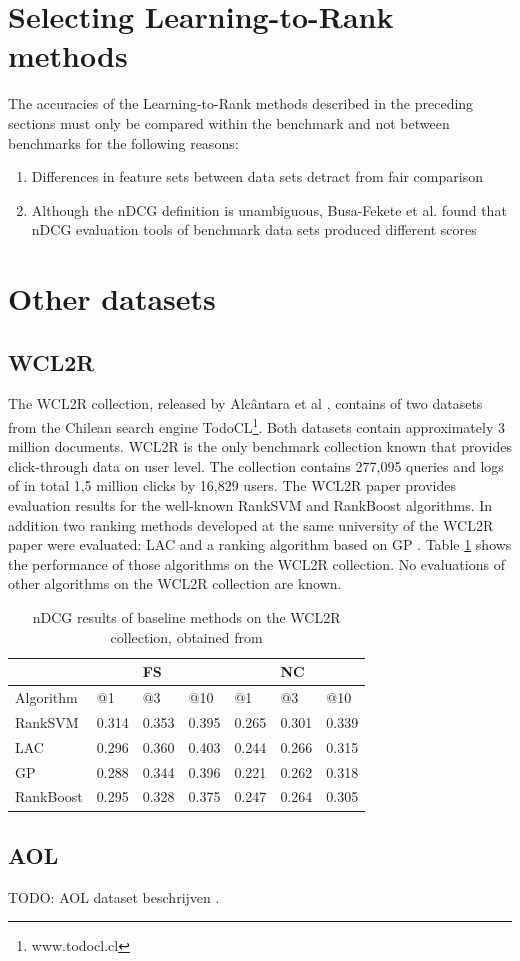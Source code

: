 \section{Selecting Learning-to-Rank methods}
The accuracies of the Learning-to-Rank methods described in the preceding sections must only be compared within the benchmark and not between benchmarks for the following reasons:
\begin{enumerate}
\item Differences in feature sets between data sets detract from fair comparison
\item Although the \ac{nDCG} definition is unambiguous, Busa-Fekete et al. \cite{Busa-Fekete2012} found that \ac{nDCG} evaluation tools of benchmark data sets produced different scores
\end{enumerate}

\section{Other datasets}
\subsection{WCL2R}
The WCL2R collection, released by Alc{\^a}ntara et al \cite{Alcantara2010}, contains of two datasets from the Chilean search engine TodoCL\footnote{www.todocl.cl}. Both datasets contain approximately 3 million documents. WCL2R is the only benchmark collection known that provides click-through data on user level. The collection contains 277,095 queries and logs of in total 1,5 million clicks by 16,829 users. The WCL2R paper provides evaluation results for the well-known Rank\ac{SVM} \cite{Herbrich1999,Joachims2002} and RankBoost \cite{Freund2003} algorithms. In addition two ranking methods developed at the same university of the WCL2R paper were evaluated: LAC \cite{Veloso2008} and a ranking algorithm based on \ac{GP} \cite{DeAlmeida2007}. Table \ref{tab:results_WCL2R} shows the performance of those algorithms on the WCL2R collection. No evaluations of other algorithms on the WCL2R collection are known.

\begin{table}
\begin{tabular}{l|lll|lll}
 &  & FS &  &  & NC &  \\ 
\hline
Algorithm & @1 & @3 & @10 & @1 & @3 & @10 \\ 
\hline
RankSVM & 0.314 & 0.353 & 0.395 & 0.265 & 0.301 & 0.339 \\ 
LAC & 0.296 & 0.360 & 0.403 & 0.244 & 0.266 & 0.315 \\ 
GP & 0.288 & 0.344 & 0.396 & 0.221 & 0.262 & 0.318 \\ 
RankBoost & 0.295 & 0.328 & 0.375 & 0.247 & 0.264 & 0.305 \\ 
\end{tabular}
\caption{\acs{nDCG} results of baseline methods on the WCL2R collection, obtained from \cite{Alcantara2010}}
\label{tab:results_WCL2R}
\end{table}

\subsection{AOL}
TODO: AOL dataset beschrijven \cite{Pass2006}.